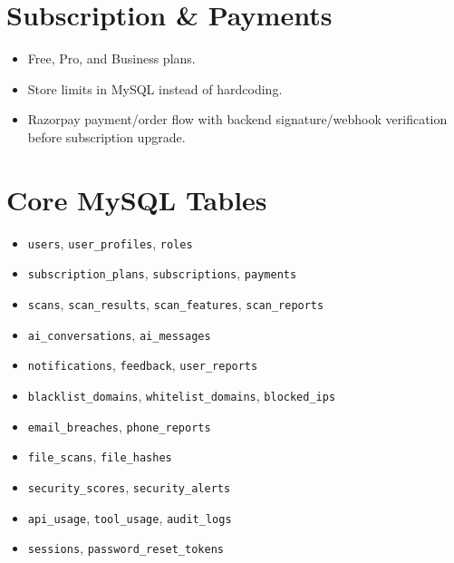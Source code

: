 \documentclass[11pt,a4paper]{article}
\begin{document}
\section{Subscription \& Payments}
\begin{itemize}[noitemsep]
    \item Free, Pro, and Business plans.
    \item Store limits in MySQL instead of hardcoding.
    \item Razorpay payment/order flow with backend signature/webhook verification before subscription upgrade.
\end{itemize}

\section{Core MySQL Tables}
\begin{itemize}[noitemsep]
    \item \texttt{users}, \texttt{user\_profiles}, \texttt{roles}
    \item \texttt{subscription\_plans}, \texttt{subscriptions}, \texttt{payments}
    \item \texttt{scans}, \texttt{scan\_results}, \texttt{scan\_features}, \texttt{scan\_reports}
    \item \texttt{ai\_conversations}, \texttt{ai\_messages}
    \item \texttt{notifications}, \texttt{feedback}, \texttt{user\_reports}
    \item \texttt{blacklist\_domains}, \texttt{whitelist\_domains}, \texttt{blocked\_ips}
    \item \texttt{email\_breaches}, \texttt{phone\_reports}
    \item \texttt{file\_scans}, \texttt{file\_hashes}
    \item \texttt{security\_scores}, \texttt{security\_alerts}
    \item \texttt{api\_usage}, \texttt{tool\_usage}, \texttt{audit\_logs}
    \item \texttt{sessions}, \texttt{password\_reset\_tokens}
\end{itemize}
\end{document}
